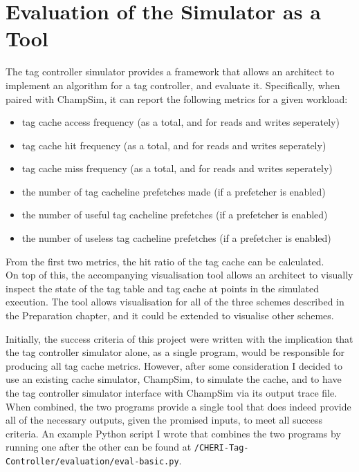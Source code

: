\section{Evaluation of the Simulator as a Tool}
The tag controller simulator provides a framework that allows an architect to implement an algorithm for a tag controller, and evaluate it. Specifically, when paired with ChampSim, it can report the following metrics for a given workload:
\begin{itemize}
	\item tag cache access frequency (as a total, and for reads and writes seperately)
	\item tag cache hit frequency (as a total, and for reads and writes seperately)
	\item tag cache miss frequency (as a total, and for reads and writes seperately)
	\item the number of tag cacheline prefetches made (if a prefetcher is enabled)
	\item the number of useful tag cacheline prefetches (if a prefetcher is enabled)
	\item the number of useless tag cacheline prefetches (if a prefetcher is enabled)
\end{itemize}
From the first two metrics, the hit ratio of the tag cache can be calculated.\\
On top of this, the accompanying visualisation tool allows an architect to
visually inspect the state of the tag table and tag cache at points in the simulated
execution. The tool allows visualisation for all of the three schemes described
in the Preparation chapter, and it could be extended to visualise other schemes.

Initially, the success criteria of this project were written with the implication that the tag controller simulator alone, as a single program, would be responsible for producing all tag cache metrics. However, after some consideration I decided to use an existing cache simulator, ChampSim, to simulate the cache, and to have the tag controller simulator interface with ChampSim via its output trace file. When combined, the two programs provide a single tool that does indeed provide all of the necessary outputs, given the promised inputs, to meet all success criteria. An example Python script I wrote that combines the two programs by running one after the other can be found at \texttt{/CHERI-Tag-Controller/evaluation/eval-basic.py}.


